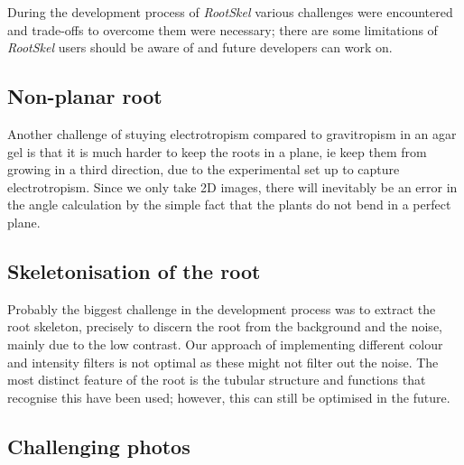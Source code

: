 During the development process of \textit{RootSkel} various challenges were encountered and trade-offs to overcome them were necessary; there are some limitations of \textit{RootSkel} users should be aware of and future developers can work on.


\subsection{Non-planar root}

Another challenge of stuying electrotropism compared to gravitropism in an agar gel is that it is much harder to keep the roots in a plane, ie keep them from growing in a third direction, due to the experimental set up to capture electrotropism. Since we only take 2D images, there will inevitably be an error in the angle calculation by the simple fact that the plants do not bend in a perfect plane.


\subsection{Skeletonisation of the root}

Probably the biggest challenge in the development process was to extract the root skeleton, precisely to discern the root from the background and the noise, mainly due to the low contrast. %
Our approach of implementing different colour and intensity filters is not optimal as these might not filter out the noise. 
The most distinct feature of the root is the tubular structure and functions that recognise this have been used; however, this can still be optimised in the future.



\subsection{Challenging photos}

